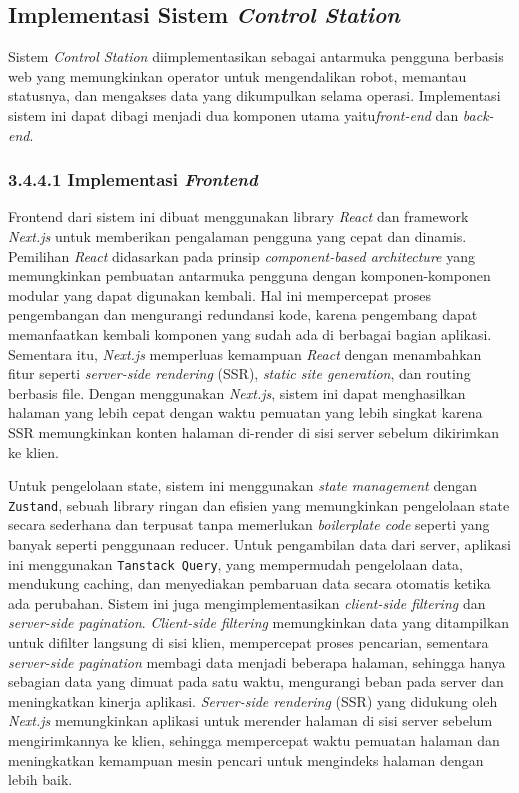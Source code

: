 \subsection{Implementasi Sistem \emph{Control Station}}
Sistem \emph{Control Station} diimplementasikan sebagai antarmuka pengguna berbasis web yang memungkinkan operator untuk mengendalikan robot, memantau statusnya, dan mengakses data yang dikumpulkan selama operasi. Implementasi sistem ini dapat dibagi menjadi dua komponen utama yaitu\emph{front-end} dan \emph{back-end}.

\subsubsection{3.4.4.1 Implementasi \emph{Frontend}}
Frontend dari sistem ini dibuat menggunakan library \textit{React} dan framework \textit{Next.js} untuk memberikan pengalaman pengguna yang cepat dan dinamis. Pemilihan \textit{React} didasarkan pada prinsip \textit{component-based architecture} yang memungkinkan pembuatan antarmuka pengguna dengan komponen-komponen modular yang dapat digunakan kembali. Hal ini mempercepat proses pengembangan dan mengurangi redundansi kode, karena pengembang dapat memanfaatkan kembali komponen yang sudah ada di berbagai bagian aplikasi. Sementara itu, \textit{Next.js} memperluas kemampuan \textit{React} dengan menambahkan fitur seperti \textit{server-side rendering} (SSR), \textit{static site generation}, dan routing berbasis file. Dengan menggunakan \textit{Next.js}, sistem ini dapat menghasilkan halaman yang lebih cepat dengan waktu pemuatan yang lebih singkat karena SSR memungkinkan konten halaman di-render di sisi server sebelum dikirimkan ke klien.

Untuk pengelolaan state, sistem ini menggunakan \textit{state management} dengan \texttt{Zustand}, sebuah library ringan dan efisien yang memungkinkan pengelolaan state secara sederhana dan terpusat tanpa memerlukan \textit{boilerplate code} seperti yang banyak seperti penggunaan reducer. Untuk pengambilan data dari server, aplikasi ini menggunakan \texttt{Tanstack Query}, yang mempermudah pengelolaan data, mendukung caching, dan menyediakan pembaruan data secara otomatis ketika ada perubahan. Sistem ini juga mengimplementasikan \textit{client-side filtering} dan \textit{server-side pagination}. \textit{Client-side filtering} memungkinkan data yang ditampilkan untuk difilter langsung di sisi klien, mempercepat proses pencarian, sementara \textit{server-side pagination} membagi data menjadi beberapa halaman, sehingga hanya sebagian data yang dimuat pada satu waktu, mengurangi beban pada server dan meningkatkan kinerja aplikasi. \textit{Server-side rendering} (SSR) yang didukung oleh \textit{Next.js} memungkinkan aplikasi untuk merender halaman di sisi server sebelum mengirimkannya ke klien, sehingga mempercepat waktu pemuatan halaman dan meningkatkan kemampuan mesin pencari untuk mengindeks halaman dengan lebih baik.

